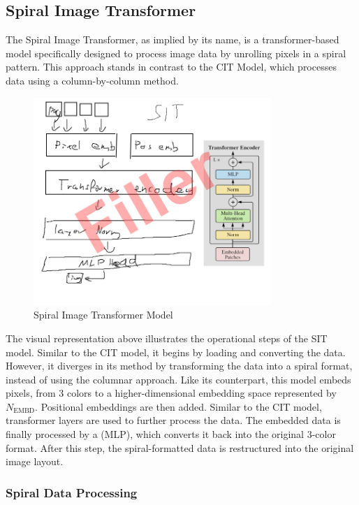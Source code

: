 

\subsection{Spiral Image Transformer}

    The Spiral Image Transformer, as implied by its name, is a transformer-based model specifically designed to process image data by unrolling pixels in a spiral pattern. This approach stands in contrast to the CIT Model, which processes data using a column-by-column method.

    \begin{figure}[H]
        \centering
        \includegraphics[width=0.8\textwidth]{imgs/SITModel.png}
        \caption{Spiral Image Transformer Model}
        \label{fig:SpiralImageTransformer}
    \end{figure}

    The visual representation above illustrates the operational steps of the SIT model. Similar to the CIT model, it begins by loading and converting the data. However, it diverges in its method by transforming the data into a spiral format, instead of using the columnar approach. Like its counterpart, this model embeds pixels, from 3 colors to a higher-dimensional embedding space represented by \(N_{\text{EMBD}}\). Positional embeddings are then added. Similar to the CIT model, transformer layers are used to further process the data. The embedded data is finally processed by a (MLP), which converts it back into the original 3-color format. After this step, the spiral-formatted data is restructured into the original image layout.

    \subsubsection{Spiral Data Processing}

